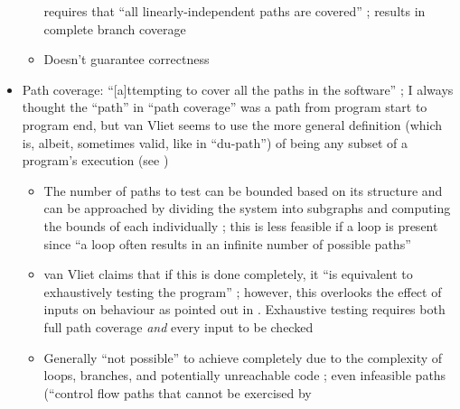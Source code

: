 \begin{itemize}
\begin{itemize}
                        requires that ``all linearly-independent paths are
                        covered'' \citep[p.~423]{vanVliet2000};
                        results in complete branch coverage
                  \item Doesn't guarantee correctness
                        \citep[p.~421]{vanVliet2000}
            \end{itemize}
      \item Path coverage: ``[a]ttempting to cover all the paths in the
            software'' \citep[p.~119]{Patton2006};
            I always thought the ``path'' in ``path coverage'' was
            a path from program start to program end, but van
            Vliet seems to use the more general definition (which
            is, albeit, sometimes valid, like in ``du-path'') of
            being any subset of a program's execution (see
            \citep[p.~420]{vanVliet2000})
            \begin{itemize}
                  \item The number of paths to test can be bounded based on its
                        structure and can be approached by dividing the system
                        into subgraphs and computing the bounds of each
                        individually \citep[pp.~471-473]{PetersAndPedrycz2000};
                        this is less feasible if a loop is present
                        \citep[pp.~473-476]{PetersAndPedrycz2000} since ``a loop
                        often results in an infinite number of possible paths''
                        \citep[p.~421]{vanVliet2000}
                  \item van Vliet claims that if this is done completely, it
                        ``is equivalent to exhaustively testing the program''
                        \citep[p.~421]{vanVliet2000};
                        however, this overlooks the effect of inputs on
                        behaviour as pointed out in
                        \citep[pp.~466-467]{PetersAndPedrycz2000}. Exhaustive
                        testing requires both full path coverage \emph{and}
                        every input to be checked
                  \item Generally ``not possible'' to achieve completely due to
                        the complexity of
                        loops, branches, and potentially unreachable code
                        \citep[p.~421]{vanVliet2000}; even infeasible
                        paths (``control flow paths that cannot be exercised by

\end{itemize}
\end{itemize}
